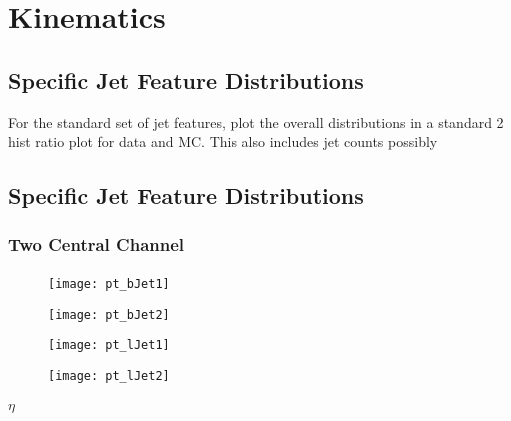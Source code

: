 \chapter{Kinematics}\label{c:K}

\section{Specific Jet Feature Distributions}

	For the standard set of jet features, plot the overall distributions in a standard 2 hist ratio plot for data and MC. This also includes jet counts possibly


\section{Specific Jet Feature Distributions}

	\subsection{Two Central Channel}
	
		\subsubsection{\pt}
		
			\begin{figure}[h]
				\centering
				
				\begin{minipage}[h]{0.33\linewidth}
					\texttt{[image: pt\_bJet1]}
				\end{minipage}
				\quad
				\begin{minipage}[h]{0.33\linewidth}
					\texttt{[image: pt\_bJet2]}
				\end{minipage}

				\begin{minipage}[h]{0.33\linewidth}
					\texttt{[image: pt\_lJet1]}
				\end{minipage}
				\quad
				\begin{minipage}[h]{0.33\linewidth}
					\texttt{[image: pt\_lJet2]}
				\end{minipage}
				\label{fig:kin:pt2c4j}
			\end{figure}
			
	
			\subsubsection{$\eta$}
				
